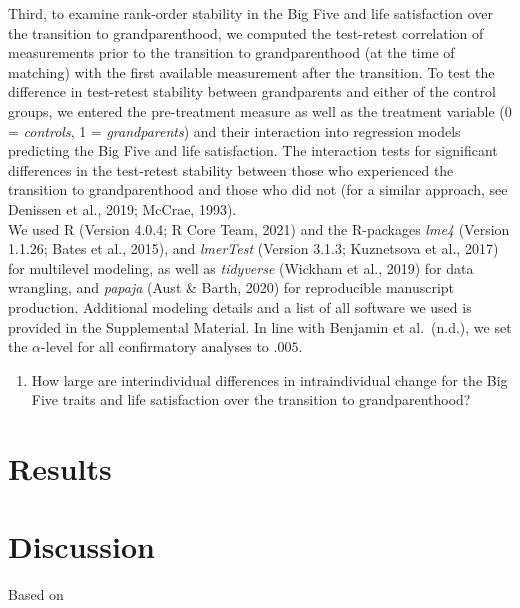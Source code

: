 \documentclass[
  english,
  man, noextraspace]{apa7}
\providecommand{\tightlist}{%
  \setlength{\itemsep}{0pt}\setlength{\parskip}{0pt}}
\begin{document}
Third, to examine rank-order stability in the Big Five and life satisfaction over the transition to grandparenthood, we computed the test-retest correlation of measurements prior to the transition to grandparenthood (at the time of matching) with the first available measurement after the transition. To test the difference in test-retest stability between grandparents and either of the control groups, we entered the pre-treatment measure as well as the treatment variable (0 = \emph{controls}, 1 = \emph{grandparents}) and their interaction into regression models predicting the Big Five and life satisfaction. The interaction tests for significant differences in the test-retest stability between those who experienced the transition to grandparenthood and those who did not (for a similar approach, see Denissen et al., 2019; McCrae, 1993).\\
We used R (Version 4.0.4; R Core Team, 2021) and the R-packages \emph{lme4} (Version 1.1.26; Bates et al., 2015), and \emph{lmerTest} (Version 3.1.3; Kuznetsova et al., 2017) for multilevel modeling, as well as \emph{tidyverse} (Wickham et al., 2019) for data wrangling, and \emph{papaja} (Aust \& Barth, 2020) for reproducible manuscript production. Additional modeling details and a list of all software we used is provided in the Supplemental Material. In line with Benjamin et al.~(n.d.), we set the \(\alpha\)-level for all confirmatory analyses to \(.005\).

\begin{enumerate}
\def\labelenumi{\arabic{enumi}.}
\setcounter{enumi}{1}
\tightlist
\item
  How large are interindividual differences in intraindividual change for the Big Five traits and life satisfaction over the transition to grandparenthood?
\end{enumerate}

\hypertarget{results}{%
\section{Results}\label{results}}

\hypertarget{discussion}{%
\section{Discussion}\label{discussion}}

Based on
\end{document}
